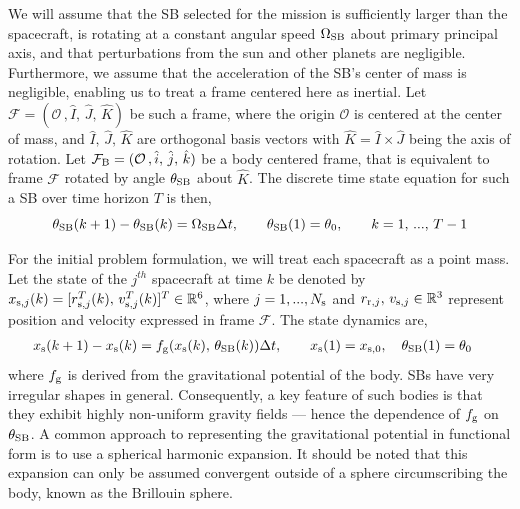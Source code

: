 \documentclass[12pt]{article}
\begin{document}
We will assume that the SB selected for the mission is sufficiently larger than the spacecraft, is rotating at a constant angular speed $\Omega_{\rm SB}$ about primary principal axis, and that perturbations from the sun and other planets are negligible. Furthermore, we assume that the acceleration of the SB's center of mass is negligible, enabling us to treat a frame centered here as inertial. Let $\mathcal{F} = (\mathcal{O}\,,\hat{I},\,\hat{J},\,\hat{K})$ be such a frame, where the origin $\mathcal{O}$ is centered at the center of mass, and $\hat{I},\,\hat{J},\,\hat{K}$ are orthogonal basis vectors with $\hat{K}=\hat{I}\times \hat{J}$ being the axis of rotation. Let $\mathcal{F}_{\rm B}= (\mathcal{O}\,,\hat{i},\,\hat{j},\,\hat{k})$  be a body centered frame, that is equivalent to frame $\mathcal{F}$ rotated by angle  $\theta_{\rm SB}$ about $\hat{K}$. The discrete time state equation for such a SB over time horizon $T$ is then, 
\begin{equation}
    {\theta}_{\rm SB}(k+1)-{\theta}_{\rm SB}(k) = \Omega_{\rm SB}\Delta t, \qquad \theta_{\rm SB}(1) = \theta_0, \qquad k=1,\,...,\,T-1
\end{equation}

For the initial problem formulation, we will treat each spacecraft as a point mass. 
Let the state of the $j^{th}$ spacecraft at time $k$ be denoted by $x_{{\rm s},j}(k) = [r^T_{{\rm s},j}(k), \, v^T_{{\rm s},j}(k) ]^T \in \mathbb{R}^6$, where $j=1,...,N_{\rm s}$ and $r_{{\rm r},j},\,v_{{\rm s},j}\in \mathbb{R}^3$ represent position and velocity expressed in frame $\mathcal{F}$.
The state dynamics are,
\begin{align}
    {x}_{\rm s}(k+1)-{x}_{\rm s}(k) &= f_{\rm g}(x_{\rm s}(k),\, \theta_{\rm SB}(k))\Delta t , \qquad x_{\rm s}(1) = x_{{\rm s,}0}, \quad \theta_{\rm SB}(1) = \theta_0 
\end{align}
where $f_{\rm g}$ is derived from the gravitational potential of the body. SBs have very irregular shapes in general. Consequently, a key feature of such bodies is that they exhibit highly non-uniform gravity fields --- hence the dependence of $f_{\rm g}$ on $\theta_{\rm SB}$. A common approach to representing the gravitational potential in functional form is to use a spherical harmonic expansion. It should be noted that this expansion can only be assumed convergent outside of a sphere circumscribing the body, known as the Brillouin sphere. 
\end{document}
